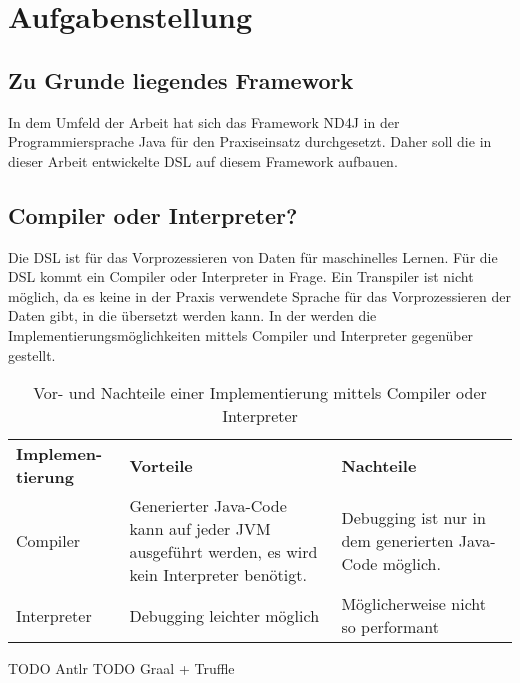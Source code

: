 \chapter{Aufgabenstellung}
\section{Zu Grunde liegendes Framework}
In dem Umfeld der Arbeit hat sich das Framework ND4J in der Programmiersprache Java für den Praxiseinsatz durchgesetzt.
Daher soll die in dieser Arbeit entwickelte \ac{DSL} auf diesem Framework aufbauen.

\section{Compiler oder Interpreter?}
Die \ac{DSL} ist für das Vorprozessieren von Daten für maschinelles Lernen.
Für die \ac{DSL} kommt ein Compiler oder Interpreter in Frage.
Ein Transpiler ist nicht möglich, da es keine in der Praxis verwendete Sprache für das Vorprozessieren der Daten gibt, in die übersetzt werden kann.
In der  werden die Implementierungsmöglichkeiten mittels Compiler und Interpreter gegenüber gestellt.

\begin{table}[H]
	\centering
	\begin{tabular}{ | p{3cm} | p{6cm} | p{6cm} | }
		\hline \rowcolor{gray!15}
		\textbf{Implemen-tierung} & \textbf{Vorteile} & \textbf{Nachteile} \\ \hhline{|=|=|=|}
		Compiler & Generierter Java-Code kann auf jeder \ac{JVM} ausgeführt werden, es wird kein Interpreter benötigt. & Debugging ist nur in dem generierten Java-Code möglich. \\ \hline
		Interpreter & Debugging leichter möglich & Möglicherweise nicht so performant \\ \hline
	\end{tabular}
	\caption{Vor- und Nachteile einer Implementierung mittels Compiler oder Interpreter}
	\label{tab:Vorteile_Compiler_Interpreter}
\end{table}

TODO Antlr
TODO Graal + Truffle

